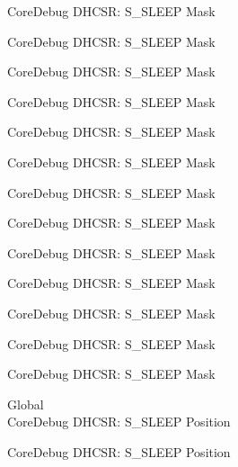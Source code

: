 \begin{DoxyRefList}
\label{deprecated__deprecated000255}%
%
Core\+Debug DHCSR\+: S\+\_\+\+SLEEP Mask 

\label{deprecated__deprecated000312}%
%
Core\+Debug DHCSR\+: S\+\_\+\+SLEEP Mask 

\label{deprecated__deprecated000388}%
%
Core\+Debug DHCSR\+: S\+\_\+\+SLEEP Mask 

\label{deprecated__deprecated000475}%
%
Core\+Debug DHCSR\+: S\+\_\+\+SLEEP Mask 

\label{deprecated__deprecated000577}%
%
Core\+Debug DHCSR\+: S\+\_\+\+SLEEP Mask 

\label{deprecated__deprecated000702}%
%
Core\+Debug DHCSR\+: S\+\_\+\+SLEEP Mask 

\label{deprecated__deprecated000794}%
%
Core\+Debug DHCSR\+: S\+\_\+\+SLEEP Mask 

\label{deprecated__deprecated000848}%
%
Core\+Debug DHCSR\+: S\+\_\+\+SLEEP Mask 

\label{deprecated__deprecated000933}%
%
Core\+Debug DHCSR\+: S\+\_\+\+SLEEP Mask 

\label{deprecated__deprecated000990}%
%
Core\+Debug DHCSR\+: S\+\_\+\+SLEEP Mask 

\label{deprecated__deprecated001066}%
%
Core\+Debug DHCSR\+: S\+\_\+\+SLEEP Mask 

\label{deprecated__deprecated001153}%
%
Core\+Debug DHCSR\+: S\+\_\+\+SLEEP Mask 

\label{deprecated__deprecated001255}%
%
Core\+Debug DHCSR\+: S\+\_\+\+SLEEP Mask  
\item[Global \doxylink{group___c_m_s_i_s___core_debug_ga349ccea33accc705595624c2d334fbcb}{Core\+Debug\+\_\+\+DHCSR\+\_\+\+S\+\_\+\+SLEEP\+\_\+\+Pos} ]\hfill \\
\label{deprecated__deprecated000023}%
%
Core\+Debug DHCSR\+: S\+\_\+\+SLEEP Position 

\label{deprecated__deprecated000115}%
%
Core\+Debug DHCSR\+: S\+\_\+\+SLEEP Position 


\end{DoxyRefList}

